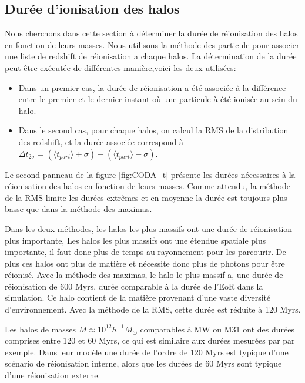 \subsection{Durée d'ionisation des halos}

Nous cherchons dans cette section à déterminer la durée de réionisation des halos en fonction de leurs masses.
Nous utilisons la méthode des particule pour associer une liste de redshift de réionisation a chaque halos.
La détermination de la durée peut être exécutée de différentes manière,voici les deux utilisées:
\begin{itemize}
\item Dans un premier cas, la durée de réionisation a été associée à la différence entre le premier et le dernier instant où une particule à été ionisée au sein du halo.
\item Dans le second cas, pour chaque halos, on calcul la RMS de la distribution des redshift, et la durée associée correspond à $\Delta t_{2\sigma} =  ( \langle t_{part} \rangle + \sigma) - ( \langle t_{part} \rangle - \sigma)$.
\end{itemize}

Le second panneau de la figure \ref{fig:CODA_t} présente les durées nécessaires à la réionisation des halos en fonction de leurs masses.
Comme attendu, la méthode de la RMS limite les durées extrêmes et en moyenne la durée est toujours plus basse que dans la méthode des maximas.

Dans les deux méthodes, les halos les plus massifs ont une durée de réionisation plus importante,
Les halos les plus massifs ont une étendue spatiale plus importante, il faut donc plus de temps au rayonnement pour les parcourir.
De plus ces halos ont plus de matière et nécessite donc plus de photons pour être réionisé.
Avec la méthode des maximas, le halo le plus massif a, une durée de réionisation de 600 Myrs, durée comparable à la durée de l'\ac{EoR} dans la simulation.
Ce halo contient de la matière provenant d'une vaste diversité d’environnement. %
Avec la méthode de la RMS, cette durée est réduite à 120 Myrs.

Les halos de masses $M \approx 10^{12} h^{-1}M_\odot$ comparables à MW ou M31 ont des durées comprises entre 120 et 60 Myrs, ce qui est similaire aux durées mesurées par \cite{ocvirk_reionization_2014} par exemple.
Dans leur modèle une durée de l'ordre de 120 Myrs est typique d'une scénario de réionisation interne, alors que les durées de 60 Myrs sont typique d'une réionisation externe.

